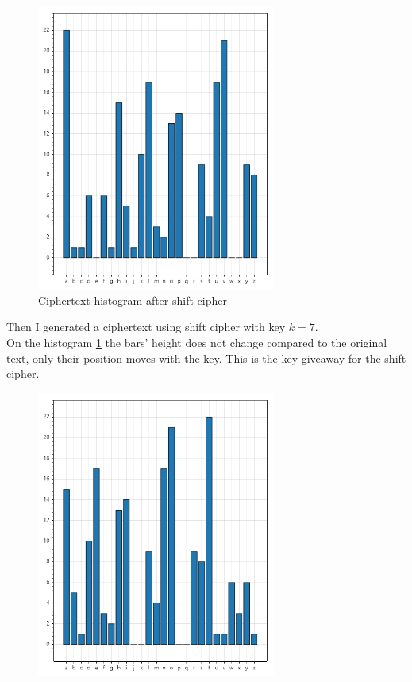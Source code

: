 \documentclass{article}
\begin{document}
\begin{enumerate}[label={}]
		\begin{figure}[H]
			\centering
			\includegraphics[width=0.7\textwidth]{shifted.png}
			\caption{Ciphertext histogram after shift cipher}
			\label{fig:shiftedHist}
		\end{figure}
		Then I generated a ciphertext using shift cipher with key $k=7$.\\
		On the histogram \ref{fig:shiftedHist} the bars' height does not change compared to the original text, only their position moves with the key. This is the key giveaway for the shift cipher.
		\begin{figure}[H]
			\centering
			\includegraphics[width=0.7\textwidth]{permuted.png}

\end{figure}
\end{enumerate}
\end{document}
